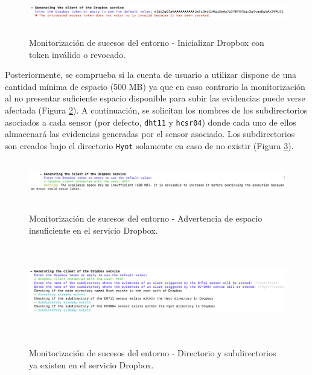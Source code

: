 \documentclass[12pt,a4paper, twoside]{report}
\begin{document}
\begin{itemize}
			\begin{figure}[!ht]   
				\caption{Monitorización de sucesos del entorno - Inicializar Dropbox con token inválido o revocado.} 
				\begin{center} 
					\includegraphics[width=17cm,height=1.2cm]{Images/userGuide/monitoring/wrongToken} \\
					\label{fig:userguide_monitoring_wrongToken} 
				\end{center}  
			\end{figure}
	 	
	 		Posteriormente, se comprueba si la cuenta de usuario a utilizar dispone de una cantidad mínima de espacio (500 MB) ya que en caso contrario la monitorización al no presentar suficiente espacio disponible para subir las evidencias puede verse afectada (Figura \ref{fig:userguide_monitoring_space}). A continuación, se solicitan los nombres de los subdirectorios asociados a cada \gls{sensor} (por defecto, \texttt{dht11} y \texttt{hcsr04}) donde cada uno de ellos almacenará las evidencias generadas por el \gls{sensor} asociado. Los subdirectorios son creados bajo el directorio \texttt{Hyot} solamente en caso de no existir (Figura \ref{fig:userguide_monitoring_dropbox}).
	 	
	 		\begin{figure}[!ht]   
				\caption{Monitorización de sucesos del entorno - Advertencia de espacio insuficiente en el servicio Dropbox.} 
				\begin{center} 
					\includegraphics[width=17cm,height=1.8cm]{Images/userGuide/monitoring/space} \\
					\label{fig:userguide_monitoring_space} 
				\end{center}  
			\end{figure}	 	
			
			\begin{figure}[!ht]   
				\caption{Monitorización de sucesos del entorno - Directorio y subdirectorios ya existen en el servicio Dropbox.} 
				\begin{center} 
					\includegraphics[width=16cm,height=4cm]{Images/userGuide/monitoring/dirDropbox} \\
					\label{fig:userguide_monitoring_dropbox} 
				\end{center}  
			\end{figure}	 	
	 	

\end{itemize}
\end{document}
